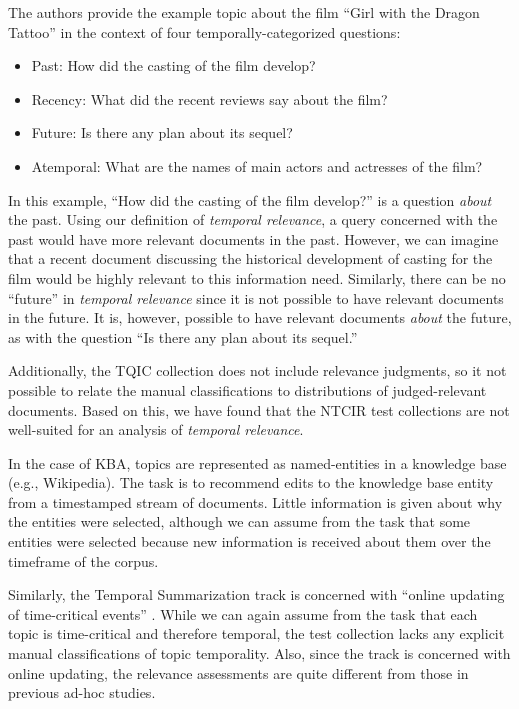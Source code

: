 \documentclass{sig-alternate}
\begin{document}
The authors provide the example topic about the film ``Girl with the Dragon Tattoo'' in the context of four temporally-categorized questions:

\begin{itemize}
\item Past: How did the casting of the film develop?
\item Recency: What did the recent reviews say about the film?
\item Future: Is there any plan about its sequel?
\item Atemporal: What are the names of main actors and actresses of the film?
\end{itemize}

In this example, ``How did the casting of the film develop?'' is a question \emph{about} the past. Using our definition of \emph{temporal relevance}, a query concerned with the past would have more relevant documents in the past. However, we can imagine that a recent document discussing the historical development of casting for the film would be highly relevant to this information need. Similarly, there can be no ``future'' in \emph{temporal relevance} since it is not possible to have relevant documents in the future. It is, however, possible to have relevant documents \emph{about} the future, as with the question ``Is there any plan about its sequel.''

Additionally, the TQIC collection does not include relevance judgments, so it not possible to relate the manual classifications to distributions of judged-relevant documents. Based on this, we have found that the NTCIR test collections are not well-suited for an analysis of \emph{temporal relevance}.

In the case of KBA, topics are represented as named-entities in a knowledge base (e.g., Wikipedia). The task is to recommend edits to the knowledge base entity from a timestamped stream of documents.  Little information is given about why the entities were selected, although we can assume from the task that some entities were selected because new information is received about them over the timeframe of the corpus. 

Similarly, the Temporal Summarization track is concerned with ``online updating of time-critical events'' \cite{Guo2013}. While we can again assume from the task that each topic is time-critical and therefore temporal, the test collection lacks any explicit manual classifications of topic temporality.  Also, since the track is concerned with online updating, the relevance assessments are quite different from those in previous ad-hoc studies.
\end{document}
